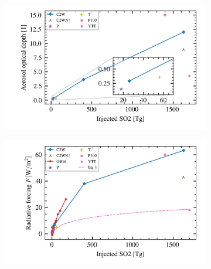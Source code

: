 \documentclass{ametsocV5}
\begin{document}
\begin{figure}
  \begin{subfigure}{0.5\linewidth}
    \centering
    \includegraphics[width=0.95\linewidth]{figures/injection_vs_aod.png}
    \caption{}%
    \label{fig:so2_vs_aod}
  \end{subfigure}
  \begin{subfigure}{0.5\linewidth}
    \centering
    \includegraphics[width=0.95\linewidth]{figures/injection_vs_toa.png}
    \caption{}%
    \label{fig:so2_vs_toa}
  \end{subfigure}


\end{figure}
\end{document}
